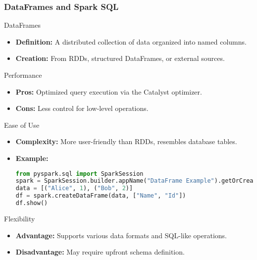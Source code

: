 \documentclass[aspectratio=169]{beamer}
\begin{document}
\begin{frame}[fragile]
    \frametitle{DataFrames and Spark SQL}

    \begin{block}{DataFrames}
        \begin{itemize}
            \item \textbf{Definition:} A distributed collection of data organized into named columns.
            \item \textbf{Creation:} From RDDs, structured DataFrames, or external sources.
        \end{itemize}

        \begin{block}{Performance}
            \begin{itemize}
                \item \textbf{Pros:} Optimized query execution via the Catalyst optimizer.
                \item \textbf{Cons:} Less control for low-level operations.
            \end{itemize}
        \end{block}

        \begin{block}{Ease of Use}
            \begin{itemize}
                \item \textbf{Complexity:} More user-friendly than RDDs, resembles database tables.
                \item \textbf{Example:}
                \begin{lstlisting}[language=Python]
from pyspark.sql import SparkSession
spark = SparkSession.builder.appName("DataFrame Example").getOrCreate()
data = [("Alice", 1), ("Bob", 2)]
df = spark.createDataFrame(data, ["Name", "Id"])
df.show()
                \end{lstlisting}
            \end{itemize}
        \end{block}

        \begin{block}{Flexibility}
            \begin{itemize}
                \item \textbf{Advantage:} Supports various data formats and SQL-like operations.
                \item \textbf{Disadvantage:} May require upfront schema definition.
            \end{itemize}
        \end{block}
    \end{block}



\end{frame}
\end{document}
